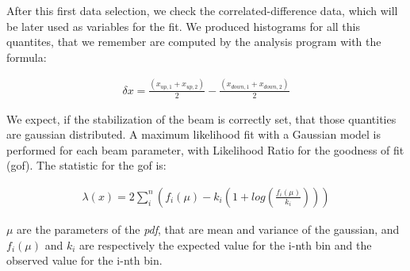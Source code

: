After this first data selection, we check the correlated-difference data, which will be later used as variables for the fit. We produced histograms for all this quantites, that we remember are computed by the analysis program with the formula:

\begin{align*}
\delta x =  \frac{(x_{up,1} + x_{up,2})}{2} - \frac{(x_{down,1} + x_{down,2})}{2}
\end{align*}

We expect, if the stabilization of the beam is correctly set, that those quantities are gaussian distributed. A maximum likelihood fit with a Gaussian model is performed for each beam parameter, with Likelihood Ratio for the goodness of fit (gof). The statistic for the gof is:

\begin{align*}
\lambda(x) = 2 \sum_{i}^{n} (f_{i}(\mu) - k_{i}(1 + log(\frac{f_{i}(\mu)}{k_{i}})))
\end{align*}  

$\mu$ are the parameters of the \textit{pdf}, that are mean and variance of the gaussian, and $f_{i}(\mu)$ and $k_{i}$ are respectively the expected value for the i-nth bin and the observed value for the i-nth bin.

